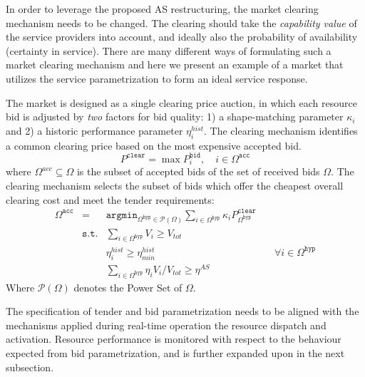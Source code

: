 In order to leverage the proposed AS restructuring, the market clearing mechanism needs to be changed. The clearing should take the \emph{capability value} of the service providers into account, and ideally also the probability of availability (certainty in service). There are many different ways of formulating such a market clearing mechanism and here we present an example of a market that utilizes the service parametrization to form an ideal service response.

The market is designed as a single clearing price auction, in which each resource bid is adjusted by \textit{two} factors for bid quality: 1) a shape-matching parameter $\kappa_i$ and 2) a historic performance  parameter $\eta^{hist}_i$.
The clearing mechanism identifies a common clearing price based on the most expensive accepted bid. 
\begin{equation}
    P^\mathtt{clear} = \max P^\mathtt{bid}_i, \quad i \in \Omega^\mathtt{acc}
\end{equation}
where $\Omega^{acc}\subseteq \Omega$ is the subset of accepted bids of the set of received bids $\Omega$. 
The clearing mechanism selects the subset of bids which offer the cheapest overall clearing cost and meet the tender requirements: 
\begin{align}
      \Omega^\mathtt{acc} &= &\mathtt{argmin}_{\Omega^\mathtt{hyp} \in \mathcal P(\Omega)} \sum_{i\in \Omega^\mathtt{hyp}}{\kappa_i P^\mathtt{clear}_{\Omega^\mathtt{hyp}} } & \\
      &\mathtt{s.t.}& \sum_{i\in \Omega^\mathtt{hyp}} V_{i}\ge V_{tot} &  \\
      &~ & \eta^{hist}_i \geq \eta^{hist}_{min} &\quad \forall i \in \Omega^\mathtt{hyp} \\
      &~ &\sum_{i\in \Omega^\mathtt{hyp}}{\eta_i V_i}/V_{tot} \geq \eta^{AS}& 
\end{align}
Where $\mathcal P(\Omega)$ denotes the Power Set of $\Omega$.

The specification of tender and bid parametrization needs to be aligned with the mechanisms applied during real-time operation the resource dispatch and activation.
Resource performance is monitored with respect to the behaviour expected from bid parametrization, and is further expanded upon in the next subsection.




